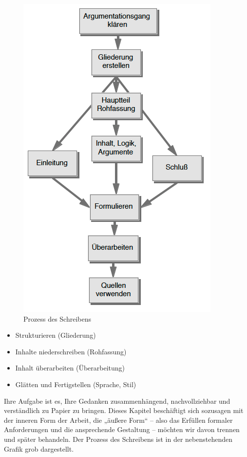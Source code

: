 \documentclass[]{book}
\providecommand{\tightlist}{%
  \setlength{\itemsep}{0pt}\setlength{\parskip}{0pt}}
\theoremstyle{definition}
\theoremstyle{definition}
\theoremstyle{definition}
\theoremstyle{remark}
\begin{document}
\begin{figure}

{\centering \includegraphics{images/schreiben-argumentationsgang-min} 

}

\caption{Prozess des Schreibens}\label{fig:unnamed-chunk-21}
\end{figure}

\begin{itemize}
\tightlist
\item
  Strukturieren (Gliederung)
\item
  Inhalte niederschreiben (Rohfassung)
\item
  Inhalt überarbeiten (Überarbeitung)
\item
  Glätten und Fertigstellen (Sprache, Stil)
\end{itemize}

Ihre Aufgabe ist es, Ihre Gedanken zusammenhängend, nachvollziehbar und
verständlich zu Papier zu bringen. Dieses Kapitel beschäftigt sich
sozusagen mit der inneren Form der Arbeit, die „äußere Form`` -- also
das Erfüllen formaler Anforderungen und die ansprechende Gestaltung --
möchten wir davon trennen und später behandeln. Der Prozess des
Schreibens ist in der nebenstehenden Grafik grob dargestellt.
\end{document}
